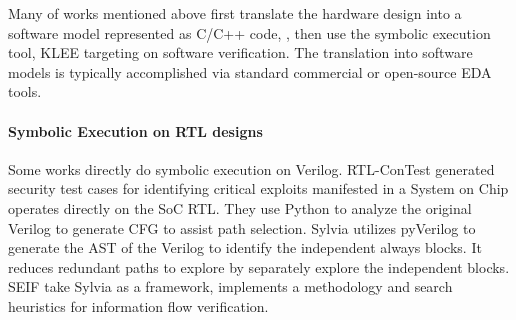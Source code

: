 \documentclass[conference]{IEEEtran}
\begin{document}

Many of works mentioned above first translate the hardware design into a software model represented as C/C++ code, , then use the symbolic execution tool, KLEE\cite{klee} targeting on software verification. The translation into software models is typically accomplished via standard commercial or open-source EDA tools.

\paragraph{Symbolic Execution on RTL designs}
Some works directly do symbolic execution on Verilog. RTL-ConTest \cite{concolic_3} generated security test cases for identifying critical exploits manifested in a System on Chip operates directly on the SoC RTL. They use Python to analyze the original Verilog to generate CFG to assist path selection. Sylvia\cite{Ryan2023Sylvia} utilizes pyVerilog to generate the AST of the Verilog to identify the independent always blocks. It reduces redundant paths to explore by separately explore the independent blocks. SEIF \cite{seif} take Sylvia as a framework, implements a methodology and search heuristics for information flow verification.
\vspace{-5pt}
\end{document}

